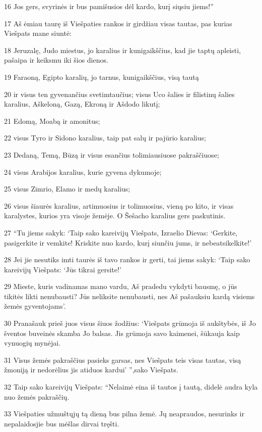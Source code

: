 \par 16 Jos gers, svyrinės ir bus pamišusios dėl kardo, kurį siųsiu jiems!” 
\par 17 Aš ėmiau taurę iš Viešpaties rankos ir girdžiau visas tautas, pas kurias Viešpats mane siuntė: 
\par 18 Jeruzalę, Judo miestus, jo karalius ir kunigaikščius, kad jie taptų apleisti, pašaipa ir keiksmu iki šios dienos. 
\par 19 Faraoną, Egipto karalių, jo tarnus, kunigaikščius, visą tautą 
\par 20 ir visus ten gyvenančius svetimtaučius; visus Uco šalies ir filistinų šalies karalius, Aškeloną, Gazą, Ekroną ir Ašdodo likutį; 
\par 21 Edomą, Moabą ir amonitus; 
\par 22 visus Tyro ir Sidono karalius, taip pat salų ir pajūrio karalius; 
\par 23 Dedaną, Temą, Būzą ir visus esančius tolimiausiuose pakraščiuose; 
\par 24 visus Arabijos karalius, kurie gyvena dykumoje; 
\par 25 visus Zimrio, Elamo ir medų karalius; 
\par 26 visus šiaurės karalius, artimuosius ir tolimuosius, vieną po kito, ir visas karalystes, kurios yra visoje žemėje. O Šešacho karalius gers paskutinis. 
\par 27 “Tu jiems sakyk: ‘Taip sako kareivijų Viešpats, Izraelio Dievas: ‘Gerkite, pasigerkite ir vemkite! Kriskite nuo kardo, kurį siunčiu jums, ir nebeatsikelkite!’ 
\par 28 Jei jie nesutiks imti taurės iš tavo rankos ir gerti, tai jiems sakyk: ‘Taip sako kareivijų Viešpats: ‘Jūs tikrai gersite!’ 
\par 29 Mieste, kuris vadinamas mano vardu, Aš pradedu vykdyti bausmę, o jūs tikitės likti nenubausti? Jūs neliksite nenubausti, nes Aš pašauksiu kardą visiems žemės gyventojams’. 
\par 30 Pranašauk prieš juos visus šiuos žodžius: ‘Viešpats grūmoja iš aukštybės, iš Jo šventos buveinės skamba Jo balsas. Jis grūmoja savo kaimenei, šūkauja kaip vynuogių mynėjai. 
\par 31 Visus žemės pakraščius pasieks garsas, nes Viešpats teis visas tautas, visą žmoniją ir nedorėlius jis atiduos kardui’ ”,­sako Viešpats. 
\par 32 Taip sako kareivijų Viešpats: “Nelaimė eina iš tautos į tautą, didelė audra kyla nuo žemės pakraščių. 
\par 33 Viešpaties užmuštųjų tą dieną bus pilna žemė. Jų neapraudos, nesurinks ir nepalaidos­jie bus mėšlas dirvai tręšti. 
